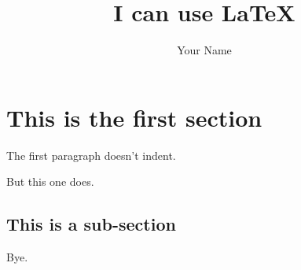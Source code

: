 \documentclass[a4paper]{article}
\title{I can use LaTeX}
\author{Your Name}
\begin{document}
\maketitle

\section{This is the first section}

The first paragraph doesn't indent.

But this one does.

\subsection{This is a sub-section}

Bye.
\end{document}
